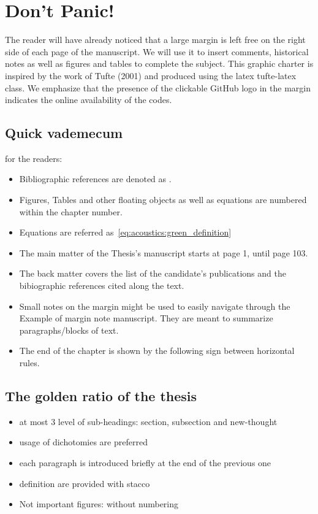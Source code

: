 \section{Don't Panic!}
The reader will have already noticed that a large margin is left free on the right side of each page of the manuscript.
We will use it to insert comments, historical notes as well as figures and tables to complete the subject.
This graphic charter is inspired by the work of Tufte (2001) and produced using the latex tufte-latex class.
We emphasize that the presence of the clickable GitHub logo in the margin indicates the online availability of the codes.

\subsection{Quick vademecum} for the readers:
\begin{itemize}
    \item Bibliographic references are denoted as \cite{kuttruff2016room}.
    \item Figures, Tables and other floating objects as well as equations are numbered within the chapter number.
    \item Equations are referred as~\cref{eq:acoustics:green_definition}
    \item The main matter of the Thesis’s manuscript starts at page 1, until page 103.
    \item The back matter covers the list of the candidate’s publications and the bibiographic references cited along the text.
    \item Small notes on the margin might be used to easily navigate through the Example of margin note manuscript. They are meant to summarize paragraphs/blocks of text.
    \item The end of the chapter is shown by the following sign between horizontal rules.
\end{itemize}

\subsection{The golden ratio of the thesis}
\begin{itemize}
    \item at most 3 level of sub-headings: section, subsection and new-thought
    \item usage of dichotomies are preferred
    \item each paragraph is introduced briefly at the end of the previous one
    \item definition are provided with stacco
    \item Not important figures: without numbering
\end{itemize}
